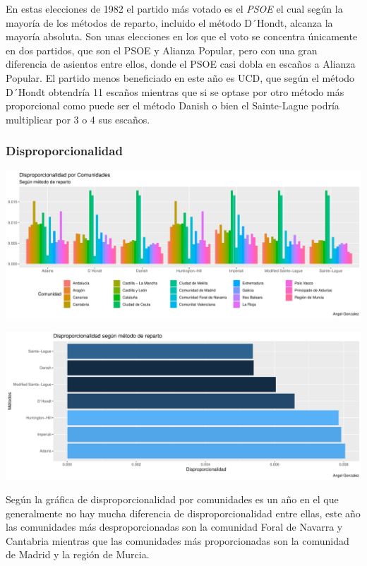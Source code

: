 \documentclass[12pt,a4paper,]{book}
\numberwithin{dummy}{section}
\theoremstyle{ocrenumbox}
\theoremstyle{blacknumex}
\theoremstyle{blacknumbox}
\theoremstyle{ocrenum}
\theoremstyle{ocrenum}
\begin{document}
En estas elecciones de 1982 el partido más votado es el \emph{PSOE} el
cual según la mayoría de los métodos de reparto, incluido el método
D´Hondt, alcanza la mayoría absoluta. Son unas elecciones en los que el
voto se concentra únicamente en dos partidos, que son el PSOE y Alianza
Popular, pero con una gran diferencia de asientos entre ellos, donde el
PSOE casi dobla en escaños a Alianza Popular. El partido menos
beneficiado en este año es UCD, que según el método D´Hondt obtendría 11
escaños mientras que si se optase por otro método más proporcional como
puede ser el método Danish o bien el Sainte-Lague podría multiplicar por
3 o 4 sus escaños.

\hypertarget{disproporcionalidad-2}{%
\subsubsection{Disproporcionalidad}\label{disproporcionalidad-2}}

\begin{center}\includegraphics[width=0.95\linewidth]{figurasR/unnamed-chunk-78-1} \end{center}

\begin{center}\includegraphics[width=0.95\linewidth]{figurasR/unnamed-chunk-78-2} \end{center}

Según la gráfica de disproporcionalidad por comunidades es un año en el
que generalmente no hay mucha diferencia de disproporcionalidad entre
ellas, este año las comunidades más desproporcionadas son la comunidad
Foral de Navarra y Cantabria mientras que las comunidades más
proporcionadas son la comunidad de Madrid y la región de Murcia.
\end{document}
